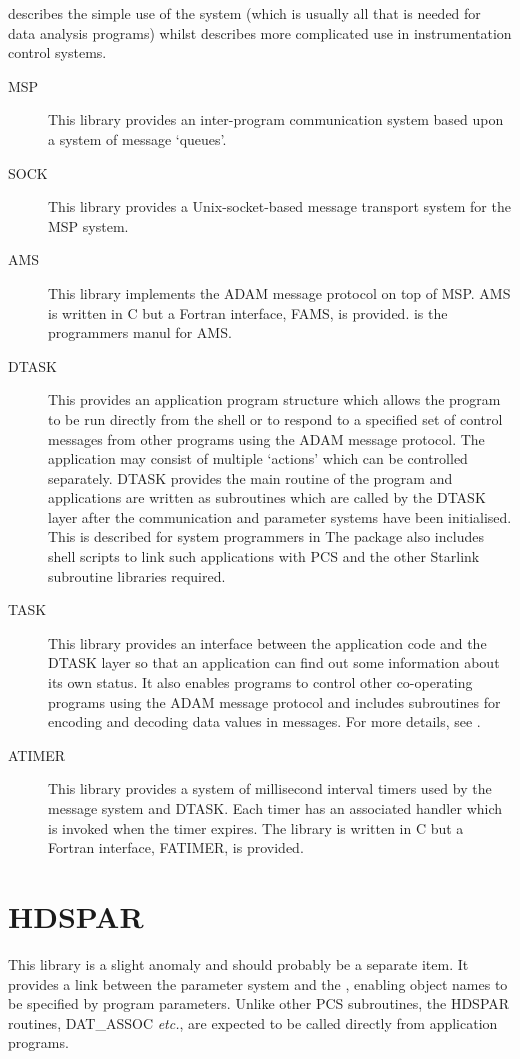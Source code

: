 \documentclass[twoside,11pt,nolof]{starlink}
\begin{document}
describes the simple use of the system (which is usually all that is needed for
data analysis programs) whilst
describes more complicated use in instrumentation control systems.
\begin{description}
\item[MSP] This library provides an inter-program communication system based
upon a system of message `queues'.
\item[SOCK] This library provides a Unix-socket-based message transport system
for the MSP system.
\item[AMS] This library implements the ADAM message protocol on top of MSP.
AMS is written in C but a Fortran interface, FAMS, is provided.
is the programmers manul for AMS.
\item[DTASK] This provides an application program structure which allows the
program to be run directly from the shell or to respond to a specified set of
control messages from other programs using the ADAM message protocol.
The application may consist of multiple `actions' which can be controlled
separately.
DTASK provides the main routine of the program and applications are written
as subroutines which are called by the DTASK layer after the communication and
parameter systems have been initialised. This is described for system
programmers in
The package also includes shell scripts to link such applications with PCS and
the other Starlink subroutine libraries required.
\item[TASK] This library provides an interface between the application code
and the DTASK layer so that an application can find out some information
about its own status. It also enables programs to control other co-operating
programs using the ADAM message protocol and includes subroutines for encoding
and decoding data values in messages.
For more details, see
.
\item[ATIMER] This library provides a system of millisecond interval timers
used by the message system and DTASK.
Each timer has an associated handler which is invoked when the timer expires.
The library is written in C but a Fortran interface, FATIMER, is provided.
\end{description}

\section{HDSPAR}
This library is a slight anomaly and should probably be a separate item.
It provides a link between the parameter system and the
,
enabling object names to be specified by program parameters.
Unlike other PCS subroutines, the HDSPAR routines, DAT\_ASSOC \textit{etc.}, are
expected to be called directly from application programs.
\end{document}
